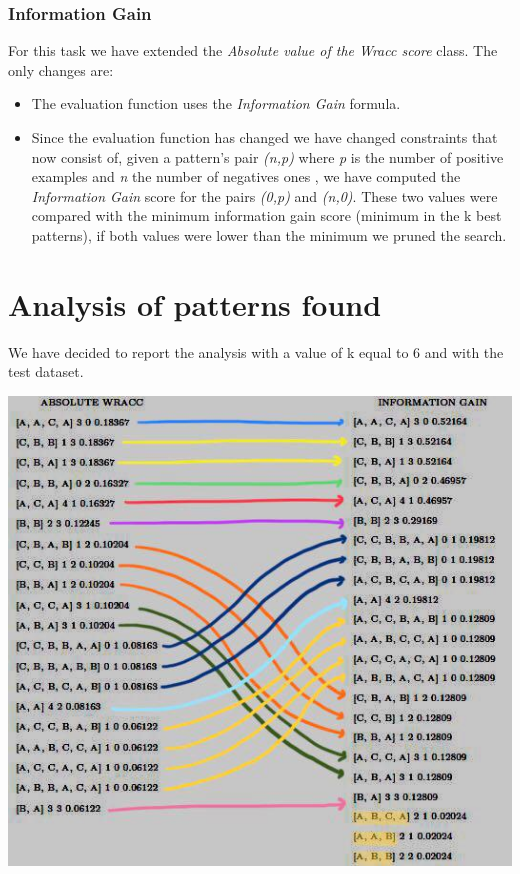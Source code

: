 \documentclass[10pt, a4paper]{article}
\begin{document}
	\subsubsection{Information Gain}
	For this task we have extended the \textit{Absolute value of the Wracc score} class. The only changes are:
	\begin{itemize}
		\item The evaluation function uses the \textit{Information Gain} formula.
		\item Since the evaluation function has changed we have changed constraints that now consist of, given a pattern's pair \textit{(n,p)} where \textit{p} is the number of positive examples and \textit{n} the number of negatives ones , we have computed the \textit{Information Gain} score for the pairs \textit{(0,p)} and \textit{(n,0)}. These two values were compared with the minimum information gain score (minimum in the k best patterns), if both values were lower than the minimum we pruned the search.	
	\end{itemize}
	\section{Analysis of patterns found}
	We have decided to report the analysis with a value of k equal to 6 and with the test dataset.
	\begin{center}
	\includegraphics[scale =0.8]{patterns.JPG}\par\vspace{1cm}
	\end{center}
	
\end{document}
